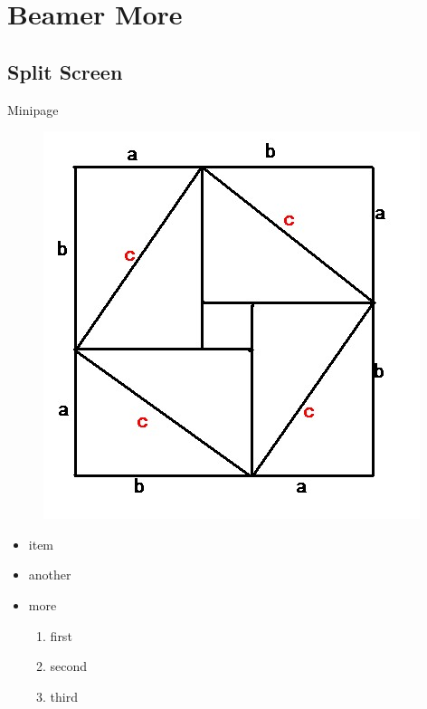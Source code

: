 \section{Beamer More}

\subsection{Split Screen}

\begin{frame}{Minipage}
    \begin{minipage}{0.5\linewidth}
        \begin{figure}[h]
            \includegraphics[width=\textwidth]{imgs/pythagorean.jpg}
        \end{figure}
    \end{minipage}%
    \hfill
    \begin{minipage}{0.4\linewidth}
        \begin{itemize}
            \item item
            \item another
            \item more
            \begin{enumerate}
                \item first
                \item second
                \item third
            \end{enumerate}
        \end{itemize}
    \end{minipage}
    
\end{frame}

